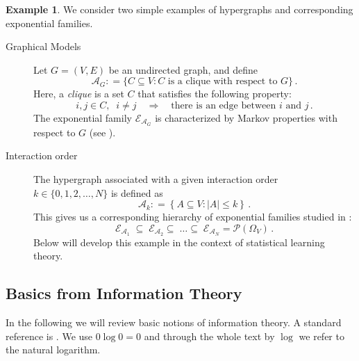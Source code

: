 \documentclass[12pt]{amsart}
\newcommand{\set}[1]{\left\lbrace #1 \right\rbrace} %
\newcommand{\defas}{\mathrel{\mathop{:}}=}   %
\renewcommand{\subset}{\subseteq}  %
\providecommand{\abs}[1]{\left\lvert#1\right\rvert}
\theoremstyle{plain}%
\theoremstyle{definition}
\newtheorem{exmp}[thm]{Example}
\theoremstyle{remark}
\begin{document}
\begin{exmp} \label{graphmod} We consider two simple examples of
  hypergraphs and corresponding exponential families. 
  \begin{description}
  \item[Graphical Models] Let $G = (V,E)$ be an undirected graph, and
  define
\begin{equation*}  
  \mathcal{A}_G \defas \{ C \subseteq V : 
  \mbox{$C$ is a clique with respect to $G$}\} \, .
\end{equation*} 
Here, a {\em clique\/} is a set $C$ that satisfies the following
property:
\[
i,j \in C, \;\; i \not= j \quad \Rightarrow \quad \mbox{there is an
  edge between $i$ and $j$} \, .
\] 
The exponential family ${\mathcal E}_{{\mathcal A}_G}$ is
characterized by Markov properties with respect to $G$ (see
\cite{lauritzen96}).
\item[Interaction order] The hypergraph associated with a given
  interaction order $k \in \{0,1,2, \dots,N\}$ is defined as
\begin{equation*}
  {\mathcal A}_k \defas \set{ A \subset V : \abs{A} \leq k} \, .
\end{equation*} 
This gives us a corresponding hierarchy of exponential families
studied in \cite{Amari01, ayknauf06}:
\[ {\mathcal E}_{{\mathcal A}_1} \; \subseteq \; {\mathcal
  E}_{{\mathcal A}_2} \subseteq \; \dots \subseteq \; {\mathcal
  E}_{{\mathcal A}_N} = {\mathcal P}({\Omega}_V)\, .
\] Below will develop this example in the context of statistical
learning theory.
\end{description}
\end{exmp}

\subsection{Basics from Information Theory}

\label{sec:informandstatistics}
In the following we will review basic notions of information theory. A
standard reference is \cite{cover91}. We use $0\log 0 = 0$ and through
the whole text by $\log$ we refer to the natural logarithm.
\end{document}

